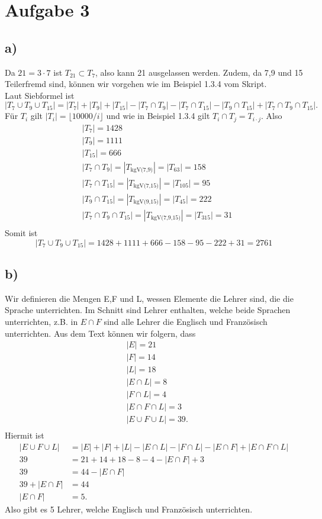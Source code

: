 \documentclass[12pt,german,a4paper]{article}
\begin{document}
\section*{Aufgabe 3}
\subsection*{a)}
Da $21=3\cdot7$ ist $T _{ 21 } \subset T _{ 7 } $, also kann 21 ausgelassen werden. Zudem, da 7,9 und 15 Teilerfremd sind, können wir vorgehen wie im Beispiel 1.3.4 vom Skript. \\
Laut Siebformel ist
$$|T_7\cup T_9\cup T _{ 15 } | = |T_{7}|+|T_{9}|+|T_{15}|-|T_{7}\cap T_{9}|-|T_{7}\cap T_{15}|-|T_{9}\cap T_{15}|+|T_{7}\cap T_{9}\cap T _{ 15 }|.$$
Für $T_i$ gilt $|T_i|=\lfloor 10000/i\rfloor$ und wie in Beispiel 1.3.4 gilt $T_i \cap T_j = T_{i\cdot j}$. Also
\begin{align*}
&|T_{7}|=1428 \\
&|T_{9}|=1111 \\
&|T_{15}|=666 \\
&|T_{7}\cap T_{9}| = |T_{\text{kgV(7,9)}}| = |T_{63}| = 158 \\
&|T_{7}\cap T_{15}| = |T_{\text{kgV(7,15)}}| = |T_{105}| = 95 \\
&|T_{9}\cap T_{15}| = |T_{\text{kgV(9,15)}}| = |T_{45}| = 222 \\
&|T_{7}\cap T_{9}\cap T_{15}| = |T_{\text{kgV(7,9,15)}}| = |T_{315}| = 31 \\
\end{align*}
Somit ist
$$
|T_7\cup T_9\cup T _{ 15 } | = 1428+1111+666-158-95-222+31=2761
$$
\subsection*{b)}
Wir definieren die Mengen E,F und L, wessen Elemente die Lehrer sind, die die Sprache unterrichten. Im Schnitt sind Lehrer enthalten, welche beide Sprachen unterrichten, z.B. in $E\cap F$ sind alle Lehrer die Englisch und Französisch unterrichten. Aus dem Text können wir folgern, dass
\begin{align*}
&|E|=21 \\
&|F|=14 \\
&|L|=18 \\
&|E\cap L|=8 \\
&|F\cap L|=4 \\
&|E\cap F\cap L|=3 \\
&|E\cup F\cup L|=39. \\
\end{align*}
Hiermit ist
\begin{align*}
|E\cup F\cup L| &= |E| + |F| + |L| - |E\cap L| - |F\cap L| - |E\cap F| + |E\cap F\cap L| \\
39 &= 21+14+18-8-4-|E\cap F|+3 \\
39 &= 44 -|E\cap F| \\
39+|E\cap F| &= 44 \\
|E\cap F| &= 5.
\end{align*}
Also gibt es 5 Lehrer, welche Englisch und Französisch unterrichten.
\pagebreak
\end{document}

